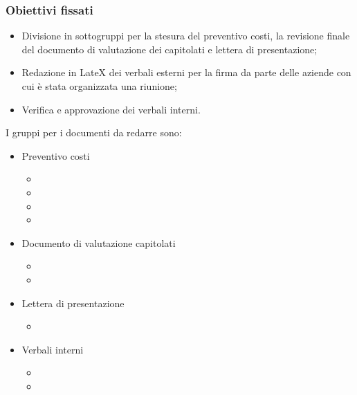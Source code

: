 \subsubsection{Obiettivi fissati}
\begin{itemize}
	\item Divisione in sottogruppi per la stesura del preventivo costi, la revisione finale del documento di valutazione dei capitolati e lettera di presentazione;
	\item Redazione in LateX dei verbali esterni per la firma da parte delle aziende con cui è stata organizzata una riunione;
	\item Verifica e approvazione dei verbali interni.
\end{itemize}
I gruppi per i documenti da redarre sono:
\begin{itemize}
	\item Preventivo costi
	\begin{itemize}
		\item \mattia
		\item \marco
		\item \sebastiano
		\item \riccardo
	\end{itemize}
	\item Documento di valutazione capitolati
	\begin{itemize}
		\item \raul
		\item \martina
	\end{itemize}
	\item Lettera di presentazione
	\begin{itemize}
		\item \martina
	\end{itemize}
	\item Verbali interni
	\begin{itemize}
		\item \raul
		\item \tommaso
	\end{itemize}
\end{itemize}